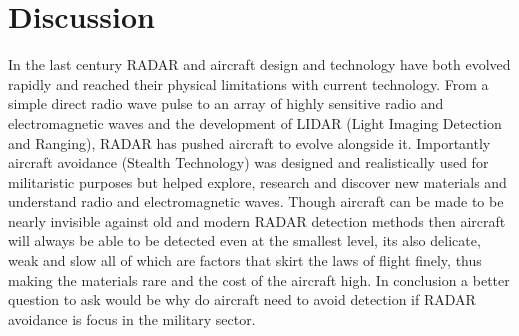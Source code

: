 \documentclass[12pt]{article}
\begin{document}
\section{Discussion}
\label{Conclusion Section}

In the last century RADAR and aircraft design and technology have both evolved rapidly and reached their physical limitations with current technology. From a simple direct radio wave pulse to an array of highly sensitive radio and electromagnetic waves and the development of LIDAR (Light Imaging Detection and Ranging), RADAR has pushed aircraft to evolve alongside it. Importantly aircraft avoidance (Stealth Technology) was designed and realistically used for militaristic purposes but helped explore, research and discover new materials and understand radio and electromagnetic waves. Though aircraft can be made to be nearly invisible against old and modern RADAR detection methods then aircraft will always be able to be detected even at the smallest level, its also delicate, weak and slow all of which are factors that skirt the laws of flight finely, thus making the materials rare and the cost of the aircraft high. In conclusion a better question to ask would be why do aircraft need to avoid detection if RADAR avoidance is focus in the military sector.  \\



\end{document}
